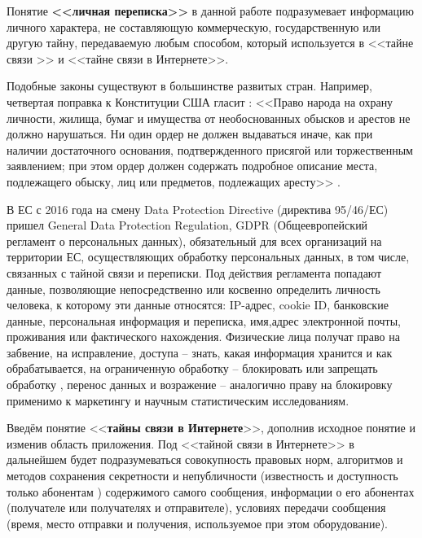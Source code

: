 Понятие \textbf{<<личная переписка>>} в данной работе  подразумевает информацию личного характера, не составляющую коммерческую, государственную или другую тайну, передаваемую любым способом,  который  используется   в <<тайне связи >> и <<тайне связи в Интернете>>.

Подобные законы существуют в большинстве развитых стран. Например, четвертая поправка  к Конституции США  гласит : <<Право народа на охрану личности, жилища, бумаг и имущества от необоснованных обысков и арестов не должно нарушаться. Ни один ордер не должен выдаваться иначе, как при наличии достаточного основания, подтвержденного присягой или торжественным заявлением; при этом ордер должен содержать подробное описание места, подлежащего обыску, лиц или предметов, подлежащих аресту>> \cite{4Popravka}.%


В ЕС  с 2016 года  на смену Data Protection Directive (директива 95/46/ЕС) пришел General Data Protection Regulation, GDPR (Общеевропейский регламент о персональных данных), обязательный для всех организаций на территории ЕС, осуществляющих  обработку персональных данных, в том числе, связанных с тайной связи и переписки.   Под действия регламента попадают данные, позволяющие непосредственно или косвенно определить личность человека, к которому эти данные относятся: IP-адрес, cookie ID, банковские данные, персональная информация и переписка, имя,адрес электронной почты, проживания или фактического нахождения. Физические лица получат право на забвение, на исправление, доступа -- знать, какая информация хранится и как обрабатывается, на ограниченную обработку -- блокировать или запрещать обработку , перенос данных и возражение -- аналогично праву на блокировку применимо к маркетингу и научным статистическим исследованиям\cite{EUDataProtec}.



Введём понятие <<\textbf{тайны связи в Интернете}>>, дополнив исходное понятие и изменив область приложения. Под <<тайной связи в Интернете>> в дальнейшем будет подразумеваться совокупность правовых норм, алгоритмов и методов сохранения секретности и  непубличности (известность и доступность только абонентам ) содержимого самого сообщения, информации о его абонентах (получателе или получателях и отправителе), условиях передачи сообщения (время, место отправки и получения, используемое при этом оборудование). 

